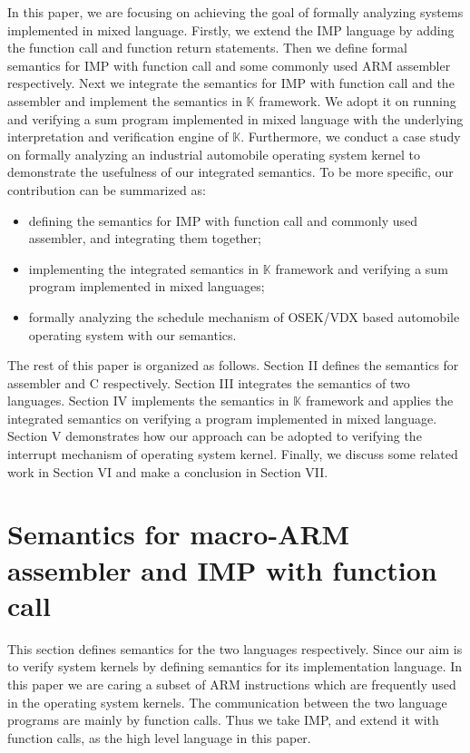 \documentclass[letterpaper, 10 pt, conference]{IEEEtran}
\begin{document}
 In this paper, we are focusing on achieving the goal of formally analyzing systems implemented in mixed language. Firstly, we extend the IMP language by adding the function call and function return statements. Then we define formal semantics for IMP with function call and some commonly used ARM assembler respectively. Next we integrate the semantics for IMP with function call and the assembler and implement the semantics in $\mathbb{K}$ framework. We adopt it on running and verifying a sum program implemented in mixed language with the underlying interpretation and verification engine of $\mathbb{K}$. Furthermore, we conduct a case study on formally analyzing an industrial automobile operating system kernel to demonstrate the usefulness of our integrated semantics. To be more specific, our contribution can be summarized as:
\begin{itemize}
	\item defining the semantics for IMP with function call and commonly used assembler, and integrating them together;
	\item implementing the integrated semantics in $\mathbb{K}$ framework and verifying a sum program implemented in mixed languages;
	\item formally analyzing the schedule mechanism of OSEK/VDX based automobile operating system with our semantics.
\end{itemize}

 The rest of this paper is organized as follows. Section II defines the semantics for assembler and C respectively. Section III integrates the semantics of two languages. Section IV implements the semantics in $\mathbb{K}$ framework and applies the integrated semantics on verifying a program implemented in mixed language. Section V demonstrates how our approach can be adopted to verifying the interrupt mechanism of operating system kernel. Finally, we discuss some related
 work in Section VI and make a conclusion in Section VII.

\section{Semantics for macro-ARM assembler and IMP with function call}
\par This section defines semantics for the two languages respectively. Since our aim is to verify system kernels by defining semantics for its implementation language. In this paper we are caring a subset of ARM instructions which are frequently used in the operating system kernels. The communication between the two language programs are mainly by function calls. Thus we take IMP, and extend it with function calls, as the high level language in this paper.
\end{document}
